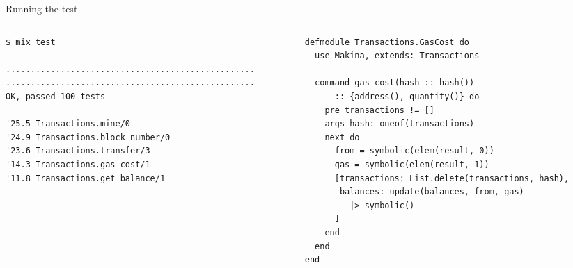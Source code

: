 \documentclass[aspectratio=169, 10pt, handout]{beamer}
\begin{document}
\begin{frame}[label={sec:org369b4b0},fragile]{Running the test}
 \begin{columns}
\begin{column}{0.44\columnwidth}
\lstset{language=bash,label= ,caption= ,captionpos=b,numbers=none,style=shell}
\begin{lstlisting}
$ mix test

..................................................
..................................................
OK, passed 100 tests

'25.5 Transactions.mine/0
'24.9 Transactions.block_number/0
'23.6 Transactions.transfer/3
'14.3 Transactions.gas_cost/1
'11.8 Transactions.get_balance/1
\end{lstlisting}
\end{column}

\begin{column}{0.52\columnwidth}
\lstset{language=elixir,label= ,caption= ,captionpos=b,numbers=none,style=display}
\begin{lstlisting}
defmodule Transactions.GasCost do
  use Makina, extends: Transactions

  command gas_cost(hash :: hash())
      :: {address(), quantity()} do
    pre transactions != []
    args hash: oneof(transactions)
    next do
      from = symbolic(elem(result, 0))
      gas = symbolic(elem(result, 1))
      [transactions: List.delete(transactions, hash),
       balances: update(balances, from, gas)
		 |> symbolic()
      ]
    end
  end
end
\end{lstlisting}
\end{column}
\end{columns}
\end{frame}
\end{document}
